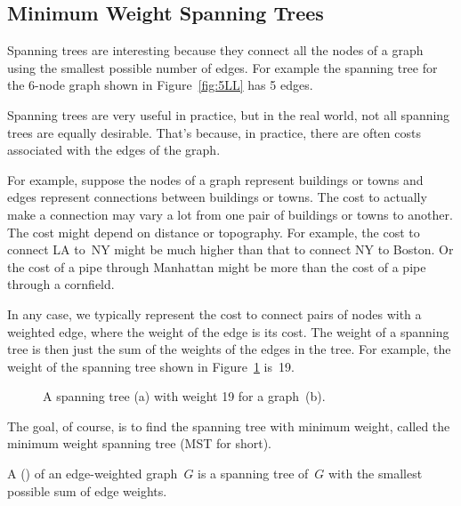 \subsection{Minimum Weight Spanning Trees}\label{MST_subsec}

Spanning trees are interesting because they connect all the nodes of a
graph using the smallest possible number of edges.  For example the
spanning tree for the 6-node graph shown in Figure~\ref{fig:5LL} has 5
edges.

Spanning trees are very useful in practice, but in the real world, not
all spanning trees are equally desirable.  That's because, in
practice, there are often costs associated with the edges of the graph.

For example, suppose the nodes of a graph represent buildings or towns
and edges represent connections between buildings or towns.  The cost
to actually make a connection may vary a lot from one pair of
buildings or towns to another.  The cost might depend on distance or
topography.  For example, the cost to connect LA to~NY might be much
higher than that to connect NY to Boston.  Or the cost of a pipe
through Manhattan might be more than the cost of a pipe through a
cornfield.

In any case, we typically represent the cost to connect pairs of nodes
with a weighted edge, where the weight of the edge is its cost.  The
weight of a spanning tree is then just the sum of the weights of the
edges in the tree.  For example, the weight of the spanning tree shown
in Figure~\ref{fig:5KA} is~19.

\begin{figure}

%
\qquad
%

\caption{A spanning tree (a) with weight 19 for a graph~(b).}

\label{fig:5KA}

\end{figure}

The goal, of course, is to find the spanning tree with minimum weight,
called the minimum weight spanning tree (MST for short).

\begin{definition}
A  (\textup{}\textup) of
an edge-weighted graph~$G$ is a spanning tree of~$G$ with the
smallest possible sum of edge weights.
\end{definition}

